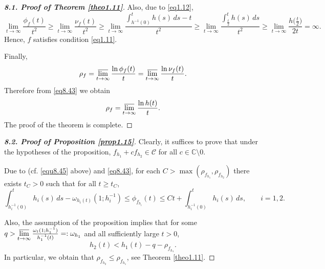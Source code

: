 \documentclass[11pt, oneside]{amsart}
\begin{document}
\begin{proof}[{\bf 8.1. Proof of Theorem \ref{theo1.11}}]
Also, due to \eqref{eq1.12},
\[
\lim_{t\rightarrow\infty}\frac{\phi_f(t)}{t^2}\ge\lim_{t\rightarrow\infty}\frac{\nu_f(t)}{t^2}\ge \lim_{t\rightarrow\infty}\frac{\int_{h^{-1}(0)}^{t}h(s)\,ds- t}{t^2}\ge \lim_{t\rightarrow\infty}\frac{\int_{\frac t2}^{t}h(s)\,ds}{t^2}\ge  \lim_{t\rightarrow\infty}\frac{h\bigl(\frac t2\bigr)}{2t}=\infty.
\]
Hence, $f$ satisfies condition \eqref{eq1.11}.

Finally,
\[
\rho_f=\varlimsup_{t\rightarrow\infty}\frac{\ln\phi_f(t)}{t}=\varlimsup_{t\rightarrow\infty}\frac{\ln\nu_f(t)}{t}.
\]
Therefore from \eqref{eq8.43} we obtain
\[
\rho_f= \varlimsup_{t\rightarrow\infty}\frac{\ln h(t)}{t}.
\]
The proof of the theorem is complete.
\end{proof}
\begin{proof}[{\bf 8.2. Proof of Proposition \ref{prop1.15}}]
Clearly, it suffices to prove that under the hypotheses of the proposition, $f_{h_1}+cf_{h_2}\in\mathscr C$ for all $c\in\mathbb C\setminus 0$. 

Due to \cite[Ch.\,I.2,\,Eq.\,(1.10)]{L} (cf. \eqref{equ8.45} above) and \eqref{eq8.43}, for each
$C>\max(\rho_{f_{h_1}},\rho_{f_{h_2}})$ there exists $t_C>0$ such that for all $t\ge t_C$,
\begin{equation}\label{eq8.48}
\int_{h_i^{-1}(0)}^t h_i(s)\, ds-\omega_{h_i(t)}(1;h_i^{-1})
\le \phi_{f_{h_i}}(t)\le Ct+\int_{h_i^{-1}(0)}^t h_i(s)\, ds,\qquad i=1,2.
\end{equation}

Also, the assumption of the proposition implies that for some $q>\displaystyle\varlimsup_{t\rightarrow\infty}\mbox{$\frac{\omega_t(1;h_1^{-1})}{h_1^{-1}(t)}$}=:\omega_{h_1}$ and all sufficiently large $t>0$,
\begin{equation}\label{eq8.49}
h_2(t)< h_1(t)-q-\rho_{f_{h_1}}.
\end{equation}
In particular, we obtain that $\rho_{f_{h_2}}\le\rho_{f_{h_1}}$, see Theorem \ref{theo1.11}.


\end{proof}
\end{document}
